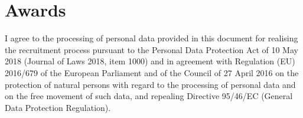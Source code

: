\documentclass[letterpaper]{template/twentysecondcv_en} %
\begin{document}
\vspace{-0.25cm}
\section{Awards}

\begin{twentyshort} %
\end{twentyshort}


\vspace{0.5cm}
\tiny{I agree to the processing of personal data provided in this document for realising the recruitment process pursuant to the Personal Data Protection Act of 10 May 2018 (Journal of Laws 2018, item 1000) and in agreement with Regulation (EU) 2016/679 of the European Parliament and of the Council of 27 April 2016 on the protection of natural persons with regard to the processing of personal data and on the free movement of such data, and repealing Directive 95/46/EC (General Data Protection Regulation).}
\end{document}

